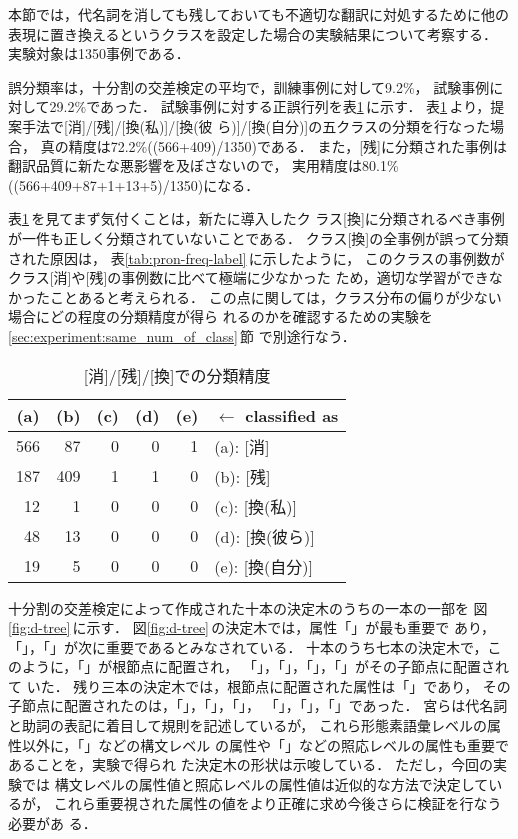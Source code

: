 本節では，代名詞を消しても残しておいても不適切な翻訳に対処するために他の
表現に置き換えるというクラスを設定した場合の実験結果について考察する．
実験対象は1350事例である．

誤分類率は，十分割の交差検定の平均で，訓練事例に対して9.2\%，
試験事例に対して29.2\%であった．
試験事例に対する正誤行列を表\ref{tab:confusion_matrix2}\,に示す．
表\ref{tab:confusion_matrix2}\,より，提案手法で[消]/[残]/[換(私)]/[換(彼
ら)]/[換(自分)]の五クラスの分類を行なった場合，
真の精度は72.2\%((566+409)/1350)である．
また，[残]に分類された事例は翻訳品質に新たな悪影響を及ぼさないので，
実用精度は80.1\%((566+409+87+1+13+5)/1350)になる．

表\ref{tab:confusion_matrix2}\,を見てまず気付くことは，新たに導入したク
ラス[換]に分類されるべき事例が一件も正しく分類されていないことである．
クラス[換]の全事例が誤って分類された原因は，
表\ref{tab:pron-freq-label}\,に示したように，
このクラスの事例数がクラス[消]や[残]の事例数に比べて極端に少なかった
ため，適切な学習ができなかったことあると考えられる．
この点に関しては，クラス分布の偏りが少ない場合にどの程度の分類精度が得ら
れるのかを確認するための実験を\ref{sec:experiment:same_num_of_class}\,節
で別途行なう．
\begin{table}[htbp]
\caption{[消]/[残]/[換]での分類精度}
\label{tab:confusion_matrix2}
\begin{center}
\begin{tabular}{|r|r|r|r|r|l|}\hline
\multicolumn{1}{|c|}{(a)} & \multicolumn{1}{c|}{(b)} &
\multicolumn{1}{|c|}{(c)} & \multicolumn{1}{c|}{(d)} &
\multicolumn{1}{|c|}{(e)} & $\leftarrow$ classified as \\\hline\hline
566 &  87 & 0 & 0 & 1 & (a): [消] \\
187 & 409 & 1 & 1 & 0 & (b): [残] \\
 12 &   1 & 0 & 0 & 0 & (c): [換(私)] \\
 48 &  13 & 0 & 0 & 0 & (d): [換(彼ら)] \\
 19 &   5 & 0 & 0 & 0 & (e): [換(自分)] \\\hline
\end{tabular}
\end{center}
\end{table}

十分割の交差検定によって作成された十本の決定木のうちの一本の一部を
図\ref{fig:d-tree}\,に示す．
図\ref{fig:d-tree}\,の決定木では，属性「\CLSTYPE」が最も重要で
あり，「\PRON」，「\FZKG」が次に重要であるとみなされている．
十本のうち七本の決定木で，このように，「\CLSTYPE」が根節点に配置され，
「\PRON」，「\FZKG」，「\ANAPH」，「\SAMEPRONB」がその子節点に配置されて
いた．
残り三本の決定木では，根節点に配置された属性は「\FZKG」であり，
その子節点に配置されたのは，「\SAMEPRONB」，「\CLSENDB」，「\CLSENDF」，
「\ANAPH」，「\PRON」，「\GVNRSEM」であった．
宮らは代名詞と助詞の表記に着目して規則を記述しているが，
これら形態素語彙レベルの属性以外に，「\CLSTYPE」などの構文レベル
の属性や「\ANAPH」などの照応レベルの属性も重要であることを，実験で得られ
た決定木の形状は示唆している．
ただし，今回の実験では
構文レベルの属性値と照応レベルの属性値は近似的な方法で決定しているが，
これら重要視された属性の値をより正確に求め今後さらに検証を行なう必要があ
る．


